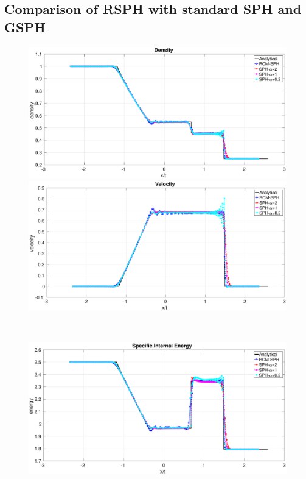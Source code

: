 \subsection{Comparison of RSPH with standard SPH and GSPH}
\begin{figure}[htp]
    \centering
    \begin{minipage}{.495\textwidth}
        \centering
        \includegraphics[width=0.99 \textwidth]{Chapter-4/Figures/Sod/RCM-Sod-SPH-alf-rho}
    \end{minipage}%
    \begin{minipage}{.495 \textwidth}
        \centering
        \includegraphics[width=0.99 \textwidth]{Chapter-4/Figures/Sod/RCM-Sod-SPH-alf-v}
    \end{minipage}%
    \\
    \begin{minipage}{.495\textwidth}
        \centering
        \includegraphics[width=0.99 \textwidth]{Chapter-4/Figures/Sod/RCM-Sod-SPH-alf-e}

\end{minipage}
\end{figure}
